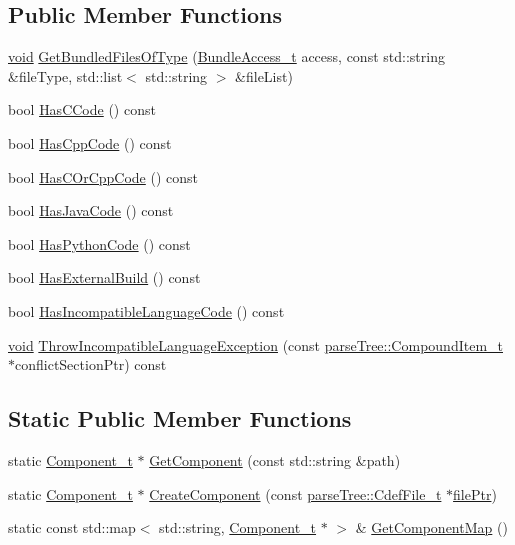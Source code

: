 \subsection*{Public Member Functions}
\begin{DoxyCompactItemize}
\item 
\hyperlink{_t_e_m_p_l_a_t_e__cdef_8h_ac9c84fa68bbad002983e35ce3663c686}{void} \hyperlink{struct_component__t_abd3ff92a1aea52b001f06b5558cf6866}{Get\+Bundled\+Files\+Of\+Type} (\hyperlink{file_system_object_8h_ad45d21047cc8ef9953d374d324715d08}{Bundle\+Access\+\_\+t} access, const std\+::string \&file\+Type, std\+::list$<$ std\+::string $>$ \&file\+List)
\item 
bool \hyperlink{struct_component__t_af7f3c84bcc9b74230a15944563a95023}{Has\+C\+Code} () const 
\item 
bool \hyperlink{struct_component__t_a2ddfbbb17db9f68a9c71054ca0e2b69a}{Has\+Cpp\+Code} () const 
\item 
bool \hyperlink{struct_component__t_a48c9328b10ea842394c483cd89327afb}{Has\+C\+Or\+Cpp\+Code} () const 
\item 
bool \hyperlink{struct_component__t_a3a0a145d0567cd17d4ed70b93232a403}{Has\+Java\+Code} () const 
\item 
bool \hyperlink{struct_component__t_acf68864a11092b47d19c11c19cba8e2c}{Has\+Python\+Code} () const 
\item 
bool \hyperlink{struct_component__t_a347e7614e9488ec76c84103c3da1851e}{Has\+External\+Build} () const 
\item 
bool \hyperlink{struct_component__t_ab408e86239c47ebac9457dea3fd33446}{Has\+Incompatible\+Language\+Code} () const 
\item 
\hyperlink{_t_e_m_p_l_a_t_e__cdef_8h_ac9c84fa68bbad002983e35ce3663c686}{void} \hyperlink{struct_component__t_a9bffa1dd34224f043ae51de4f8f555d7}{Throw\+Incompatible\+Language\+Exception} (const \hyperlink{structparse_tree_1_1_compound_item__t}{parse\+Tree\+::\+Compound\+Item\+\_\+t} $\ast$conflict\+Section\+Ptr) const 
\end{DoxyCompactItemize}
\subsection*{Static Public Member Functions}
\begin{DoxyCompactItemize}
\item 
static \hyperlink{struct_component__t}{Component\+\_\+t} $\ast$ \hyperlink{struct_component__t_a2b7eb37a689a02db0d7a7787b30f4a1b}{Get\+Component} (const std\+::string \&path)
\item 
static \hyperlink{struct_component__t}{Component\+\_\+t} $\ast$ \hyperlink{struct_component__t_a5bb11476f6b2ac664556e5639daf4286}{Create\+Component} (const \hyperlink{structparse_tree_1_1_cdef_file__t}{parse\+Tree\+::\+Cdef\+File\+\_\+t} $\ast$\hyperlink{update_daemon_8c_acf1f3d914b42896a64e8683abe22ae7a}{file\+Ptr})
\item 
static const std\+::map$<$ std\+::string, \hyperlink{struct_component__t}{Component\+\_\+t} $\ast$ $>$ \& \hyperlink{struct_component__t_a84355142e52773a2072987d855ffbc18}{Get\+Component\+Map} ()
\end{DoxyCompactItemize}
